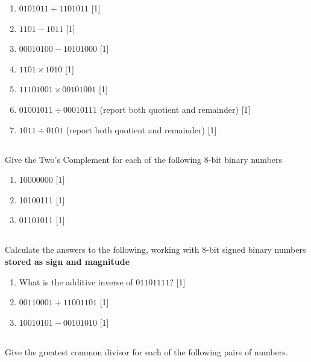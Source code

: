 \documentclass[twocolumn]{article}
\newcounter{pmarks}
\newcounter{marks}
\newcommand\mrk[1]{{\hfill\color{blue}\small[{#1}]}\addtocounter{pmarks}{#1}\addtocounter{marks}{#1}}
\begin{document}
    \begin{enumerate}
        \item $0101011 + 1101011$ \mrk{1}
        \item $1101 - 1011$ \mrk{1}
        \item $00010100 - 10101000$ \mrk{1}
        \item $1101 \times 1010$ \mrk{1}
        \item $11101001 \times 00101001$ \mrk{1}
        \item $01001011 \div 00010111$ (report both quotient and remainder) \mrk{1}
        \item $1011\div 0101$ (report both quotient and remainder) \mrk{1}
    \end{enumerate}

\subsection{}

    Give the Two’s Complement for each of the following 8-bit binary numbers
        
    \begin{enumerate}
        \item 10000000 \mrk{1}
        \item 10100111 \mrk{1}
        \item 01101011 \mrk{1}
    \end{enumerate}

\subsection{}

    Calculate the answers to the following, working with 8-bit signed binary numbers \textbf{stored as sign and magnitude}

    \begin{enumerate}
        \item What is the additive inverse of $01101111$? \mrk{1}
        \item $00110001 + 11001101$ \mrk{1}
        \item $10010101 - 00101010$ \mrk{1}
    \end{enumerate}

\subsection{}

   Give the greatest common divisor for each of the following pairs of numbers.
\end{document}
